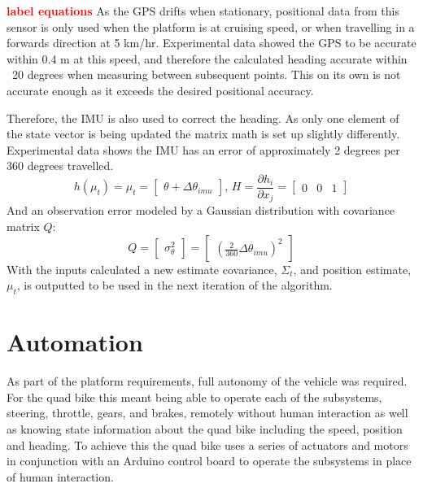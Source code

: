 \documentclass[main.tex]{subfiles}
\begin{document}
\textcolor{red}{\textbf{label equations}} As the GPS drifts when stationary, positional data from this sensor is only used when the platform is at cruising speed, or when travelling in a forwards direction at 5 km/hr. Experimental data showed the GPS to be accurate within 0.4 m at this speed, and therefore the calculated heading accurate within ~20 degrees when measuring between subsequent points. This on its own is not accurate enough as it exceeds the desired positional accuracy.  

Therefore, the IMU is also used to correct the heading. As only one element of the state vector is being updated the matrix math is set up slightly differently. Experimental data shows the IMU has an error of approximately 2 degrees per 360 degrees travelled.
\[
h(\mu_t) = \mu_t = 
\begin{bmatrix}
    \theta + \Delta \theta_{imu}
\end{bmatrix}
\textrm{, } H = \frac{\partial h_i}{\partial x_j} = 
\begin{bmatrix}
    0	&	0	&	1
\end{bmatrix}
\]
And an observation error modeled by a Gaussian distribution with covariance matrix $Q$:
\[
Q = 
\begin{bmatrix}
    \sigma_\theta^2
\end{bmatrix}
=
\begin{bmatrix}
    (\frac{2}{360}\Delta \theta_{imu})^2
\end{bmatrix}
\]
With the inputs calculated a new estimate covariance, $\Sigma_t$, and position estimate, $\mu_t$, is outputted to be used in the next iteration of the algorithm. 

\section{Automation}

As part of the platform requirements, full autonomy of the vehicle was required. For the quad bike this meant being able to operate each of the subsystems, steering, throttle, gears, and brakes, remotely without human interaction as well as knowing state information about the quad bike including the speed, position and heading. To achieve this the quad bike uses a series of actuators and motors in conjunction with an Arduino control board to operate the subsystems in place of human interaction.
\end{document}
